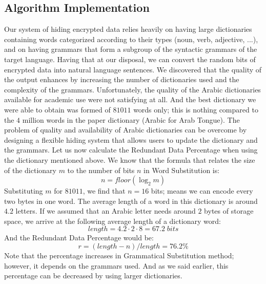 \documentclass{acm_proc_article-sp}
\begin{document}
\subsection{Algorithm Implementation}\label{Algorithm-Implementation}
Our system of hiding encrypted data relies heavily on having large dictionaries containing words categorized according to their types (noun, verb, adjective, ...), and on having grammars that form a subgroup of the syntactic grammars of the target language. Having that at our disposal, we can convert the random bits of encrypted data into natural language sentences. We discovered that the quality of the output enhances by increasing the number of dictionaries used and the complexity of the grammars. Unfortunately, the quality of the Arabic dictionaries available for academic use were not satisfying at all. And the best dictionary we were able to obtain was formed of $81011$ words only; this is nothing compared to the $4$ million words in the paper dictionary  (Arabic for Arab Tongue). The problem of quality and availability of Arabic dictionaries can be overcome by designing a flexible hiding system that allows users to update the dictionary and the grammars. Let us now calculate the Redundant Data Percentage when using the dictionary mentioned above. We know that the formula that relates the size of the dictionary $m$ to the number of bits $n$ in Word Substitution is:
\begin{equation*}
    n=\mathit{floor}(\log_{2}m)
\end{equation*}
Substituting $m$ for $81011$, we find that $n=16$ bits; means we can encode every two bytes in one word. The average length of a word in this dictionary is around $4.2$ letters. If we assumed that an Arabic letter needs around $2$ bytes of storage space, we arrive at the following average length of a dictionary word:
\begin{equation*}
    \mathit{length}=4.2\cdot2\cdot8=67.2\mathit{\; bits}
\end{equation*}
And the Redundant Data Percentage would be:
\begin{equation*}
    r=(\mathit{length}-n)/\mathit{length}=76.2\%
\end{equation*}
Note that the percentage increases in Grammatical Substitution method; however, it depends on the grammars used. And as we said earlier, this percentage can be decreased by using larger dictionaries.
\end{document}
